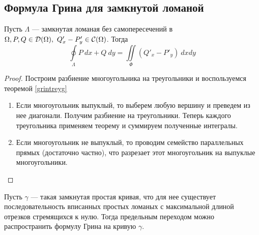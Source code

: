 \subsection{Формула Грина для замкнутой ломаной}
\begin{theorem}
    Пусть $\Lambda$ --- замкнутая ломаная без самопересечений в $\Omega,\\
    P,Q\in \mathcal{D}(\Omega),\ Q_x'-P_y'\in \mathcal{C}(\Omega)$. Тогда
    \[\oint\limits_{\Lambda}P\ dx+Q\ dy=\iint\limits_{\Phi}(Q'_x-P'_y)\ dxdy\]
\end{theorem}
\begin{proof}
    Построим разбиение многоугольника на треугольники и воспользуемся теоремой \ref{grintreyg}
    \begin{enumerate}
        \item Если многоугольник выпуклый, то выберем любую вершину и преведем из нее диагонали. Получим разбиение на треугольники. Теперь каждого треугольника применяем теорему и суммируем полученные интегралы.
        \item Если многоугольник не выпуклый, то проводим семейство параллельных прямых (достаточно частно), что разрезает этот многоугольник на выпуклые многоугольники.
    \end{enumerate}
\end{proof}
\begin{consequense}
    Пусть $\gamma$ --- такая замкнутая простая кривая, что для нее существует последовательность вписанных простых ломаных с максимальной длиной отрезков стремящихся к нулю. Тогда предельным переходом можно распространить формулу Грина на кривую $\gamma$.
\end{consequense}
